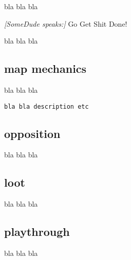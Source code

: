 bla bla bla

\begin{readoutloud}
\emph{[SomeDude speaks:]}
Go Get Shit Done!
\end{readoutloud}

\noindent bla bla bla


\subsection*{map mechanics}

bla bla bla

\small \begin{verbatim}
bla bla description etc
\end{verbatim} \normalsize


\subsection*{opposition}

bla bla bla


\subsection*{loot}

bla bla bla


\subsection*{playthrough}

bla bla bla





























































